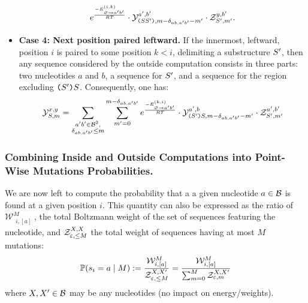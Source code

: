 \begin{itemize}
\begin{equation}
  		 e^{\frac{-E^{(i,k)}_{{\varnothing}\to{a'b'}}}{RT}}
		 \cdot\mathcal{Y}_{\text{\tt(}S S'\text{\tt )}, m- \delta_{ab,a'b'} - m'}^{a',b'}
     \cdot\mathcal{Z}_{S', m'}^{y,b'} .
\label{eq:Y_rec_C}
\end{equation}
\item {\bf Case 4: Next position paired leftward.} If the innermost, leftward, position $i$ is paired to some position $k<i$, delimiting a substructure $S'$, then any sequence considered by the outside computation consists in three parts: two nucleotides $a$ and $b$, a sequence for $S'$, and a sequence for the region excluding $\text{\tt(}S'\text{\tt )}S$. Consequently, one has:
\begin{equation}
	\mathcal{Y}_{S, m}^{x,y} = 
		 \sum_{\substack{a'b'\in \mathcal{B}^2,\\ \delta_{ab,a'b'}\le m}}
		 \sum_{m'=0}^{m-\delta_{ab,a'b'}}
   	 e^{\frac{-E^{(k,i)}_{{\varnothing}\to{a'b'}}}{RT}}
		 \cdot\mathcal{Y}_{\text{\tt(}S'\text{\tt )}S, m- \delta_{ab,a'b'} - m'}^{a',b}
     \cdot\mathcal{Z}_{S', m'}^{a',b'}
\label{eq:Y_rec_D}
\end{equation}
\end{itemize}

\subsubsection{Combining Inside and Outside Computations into Point-Wise Mutations Probabilities.}


We are now left to compute the probability that a a given nucleotide $a\in\mathcal{B}$ is found at a given position $i$.
This quantity can also be expressed as the ratio of $\mathcal{W}^M_{\substack{i, [a]}}$, the total Boltzmann weight 
of the set of sequences featuring the nucleotide, and $\mathcal{Z}_{\varepsilon, \le M}^{X,X}$ the total weight of sequences having at most $M$ mutations:
\begin{equation}
	\mathbb{P}(s_i = a\;|\; M) := \frac{\mathcal{W}^M_{\substack{i, [a]}}}{\mathcal{Z}_{\varepsilon, \le M}^{X,X'}} = \frac{\mathcal{W}^M_{\substack{i, [a]}}}{\sum_{m=0}^{M}\mathcal{Z}_{\varepsilon, m}^{X,X'}}\label{eq:normalize}
\end{equation}
where $X,X'\in\mathcal{B}$ may be any nucleotides (no impact on energy/weights).

